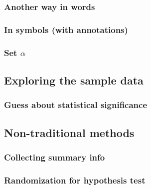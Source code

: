\documentclass[
  12pt, krantz2,
]{krantz}
\begin{document}
\hypertarget{another-way-in-words}{%
\subsubsection*{Another way in words}\label{another-way-in-words}}


\hypertarget{in-symbols-with-annotations-2}{%
\subsubsection*{In symbols (with annotations)}\label{in-symbols-with-annotations-2}}


\hypertarget{set-alpha-2}{%
\subsubsection*{\texorpdfstring{Set \(\alpha\)}{Set \textbackslash alpha}}\label{set-alpha-2}}


\hypertarget{exploring-the-sample-data-2}{%
\subsection{Exploring the sample data}\label{exploring-the-sample-data-2}}

\hypertarget{guess-about-statistical-significance-2}{%
\subsubsection*{Guess about statistical significance}\label{guess-about-statistical-significance-2}}


\hypertarget{non-traditional-methods-2}{%
\subsection{Non-traditional methods}\label{non-traditional-methods-2}}

\hypertarget{collecting-summary-info}{%
\subsubsection*{Collecting summary info}\label{collecting-summary-info}}


\hypertarget{randomization-for-hypothesis-test}{%
\subsubsection*{Randomization for hypothesis test}\label{randomization-for-hypothesis-test}}
\end{document}
